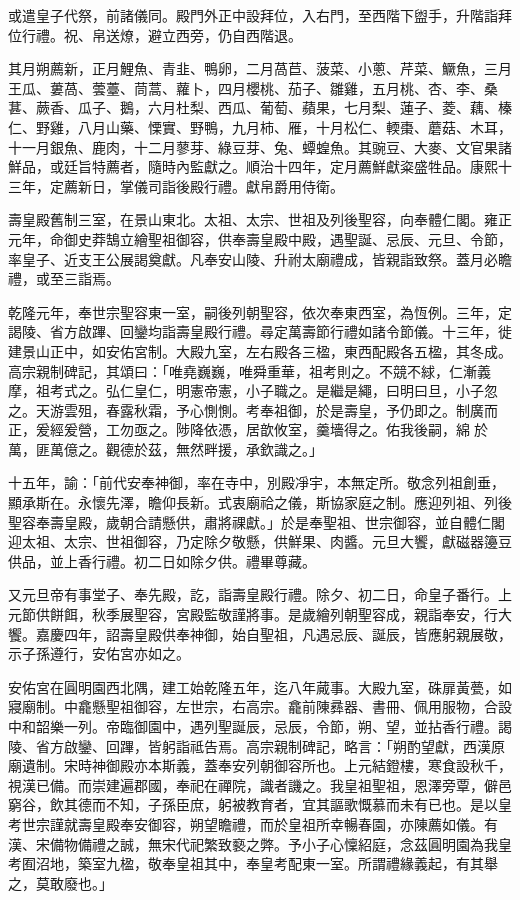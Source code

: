 \begin{pinyinscope}
或遣皇子代祭，前諸儀同。殿門外正中設拜位，入右門，至西階下盥手，升階詣拜位行禮。祝、帛送燎，避立西旁，仍自西階退。

其月朔薦新，正月鯉魚、青韭、鴨卵，二月萵苣、菠菜、小蔥、芹菜、鱖魚，三月王瓜、蔞萵、蕓薹、茼蒿、蘿卜，四月櫻桃、茄子、雛雞，五月桃、杏、李、桑葚、蕨香、瓜子、鵝，六月杜梨、西瓜、葡萄、蘋果，七月梨、蓮子、菱、藕、榛仁、野雞，八月山藥、慄實、野鴨，九月柿、雁，十月松仁、輭棗、蘑菇、木耳，十一月銀魚、鹿肉，十二月蓼芽、綠豆芽、兔、蟫蝗魚。其豌豆、大麥、文官果諸鮮品，或廷旨特薦者，隨時內監獻之。順治十四年，定月薦鮮獻粢盛牲品。康熙十三年，定薦新日，掌儀司詣後殿行禮。獻帛爵用侍衛。

壽皇殿舊制三室，在景山東北。太祖、太宗、世祖及列後聖容，向奉體仁閣。雍正元年，命御史莽鵠立繪聖祖御容，供奉壽皇殿中殿，遇聖誕、忌辰、元旦、令節，率皇子、近支王公展謁奠獻。凡奉安山陵、升祔太廟禮成，皆親詣致祭。蓋月必瞻禮，或至三詣焉。

乾隆元年，奉世宗聖容東一室，嗣後列朝聖容，依次奉東西室，為恆例。三年，定謁陵、省方啟蹕、回鑾均詣壽皇殿行禮。尋定萬壽節行禮如諸令節儀。十三年，徙建景山正中，如安佑宮制。大殿九室，左右殿各三楹，東西配殿各五楹，其冬成。高宗親制碑記，其頌曰：「唯堯巍巍，唯舜重華，祖考則之。不競不絿，仁漸義摩，祖考式之。弘仁皇仁，明憲帝憲，小子職之。是繼是繩，曰明曰旦，小子忽之。天游雲殂，春露秋霜，予心惻惻。考奉祖御，於是壽皇，予仍即之。制廣而正，爰經爰營，工勿亟之。陟降依憑，居歆攸室，羹墻得之。佑我後嗣，綿於萬，匪萬億之。觀德於茲，無然畔援，承欽識之。」

十五年，諭：「前代安奉神御，率在寺中，別殿凈宇，本無定所。敬念列祖創垂，顯承斯在。永懷先澤，瞻仰長新。式衷廟祫之儀，斯協家庭之制。應迎列祖、列後聖容奉壽皇殿，歲朝合請懸供，肅將祼獻。」於是奉聖祖、世宗御容，並自體仁閣迎太祖、太宗、世祖御容，乃定除夕敬懸，供鮮果、肉醬。元旦大饗，獻磁器籩豆供品，並上香行禮。初二日如除夕供。禮畢尊藏。

又元旦帝有事堂子、奉先殿，訖，詣壽皇殿行禮。除夕、初二日，命皇子番行。上元節供餅餌，秋季展聖容，宮殿監敬謹將事。是歲繪列朝聖容成，親詣奉安，行大饗。嘉慶四年，詔壽皇殿供奉神御，始自聖祖，凡遇忌辰、誕辰，皆應躬親展敬，示子孫遵行，安佑宮亦如之。

安佑宮在圓明園西北隅，建工始乾隆五年，迄八年蕆事。大殿九室，硃扉黃甍，如寢廟制。中龕懸聖祖御容，左世宗，右高宗。龕前陳彞器、書冊、佩用服物，合設中和韶樂一列。帝臨御園中，遇列聖誕辰，忌辰，令節，朔、望，並拈香行禮。謁陵、省方啟鑾、回蹕，皆躬詣祗告焉。高宗親制碑記，略言：「朔酌望獻，西漢原廟遺制。宋時神御殿亦本斯義，蓋奉安列朝御容所也。上元結鐙樓，寒食設秋千，視漢已備。而崇建遍郡國，奉祀在禪院，識者譏之。我皇祖聖祖，恩澤旁覃，僻邑窮谷，飲其德而不知，子孫臣庶，躬被教育者，宜其謳歌慨慕而未有已也。是以皇考世宗謹就壽皇殿奉安御容，朔望瞻禮，而於皇祖所幸暢春園，亦陳薦如儀。有漢、宋備物備禮之誠，無宋代祀繁致褻之弊。予小子心懍紹庭，念茲圓明園為我皇考囿沼地，築室九楹，敬奉皇祖其中，奉皇考配東一室。所謂禮緣義起，有其舉之，莫敢廢也。」


\end{pinyinscope}
